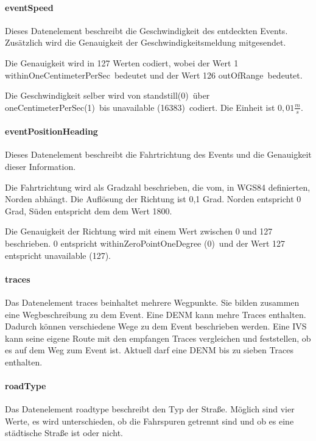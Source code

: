 \paragraph{eventSpeed}
Dieses Datenelement beschreibt die Geschwindigkeit des entdeckten Events. Zusätzlich wird die Genauigkeit der Geschwindigkeitsmeldung mitgesendet. 

Die Genauigkeit wird in 127 Werten codiert, wobei der Wert 1 \glqq withinOneCentimeterPerSec\grqq~bedeutet und der Wert 126 \glqq outOfRange\grqq~bedeutet. 

Die Geschwindigkeit selber wird von \glqq standstill(0)\grqq~über \glqq oneCentimeterPerSec(1)\grqq~bis \glqq unavailable (16383)\grqq~codiert. Die Einheit ist $0,01 \frac{m}{s}$.

\paragraph{eventPositionHeading}
Dieses Datenelement beschreibt die Fahrtrichtung des Events und die Genauigkeit dieser Information. 

Die Fahrtrichtung wird als Gradzahl beschrieben, die vom, in WGS84 definierten, Norden abhängt. Die Auflösung der Richtung ist 0,1 Grad. Norden entspricht 0 Grad, Süden entspricht dem dem Wert 1800.

Die Genauigkeit der Richtung wird mit einem Wert zwischen 0 und 127 beschrieben. 0 entspricht \glqq withinZeroPointOneDegree (0)\grqq~und der Wert 127 entspricht \glqq unavailable (127)\grqq.

\paragraph{traces}
Das Datenelement traces beinhaltet mehrere Wegpunkte. Sie bilden zusammen eine Wegbeschreibung zu dem Event. Eine \ac{DENM} kann mehre Traces enthalten. Dadurch können verschiedene Wege zu dem Event beschrieben werden. Eine \ac{IVS} kann seine eigene Route mit den empfangen Traces	 vergleichen und feststellen, ob es auf dem Weg zum Event ist. Aktuell darf eine \ac{DENM} bis zu sieben Traces enthalten.


\paragraph{roadType}
Das Datenelement roadtype beschreibt den Typ der Straße. Möglich sind vier Werte, es wird unterschieden, ob die Fahrspuren getrennt sind und ob es eine städtische Straße ist oder nicht. 


